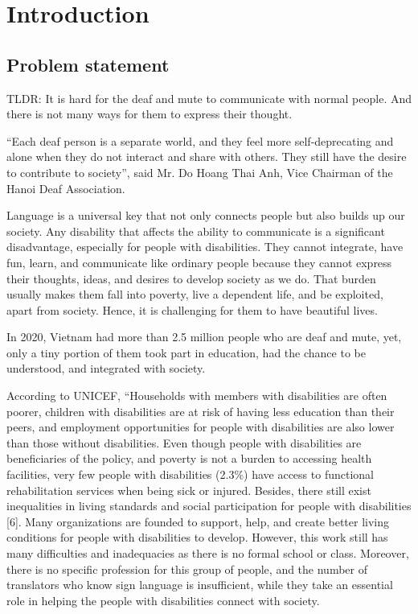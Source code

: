 \chapter {Introduction}
	
\section{Problem statement}


TLDR: It is hard for the deaf and mute to communicate with normal people. And there is not many ways for them to express their thought.

“Each deaf person is a separate world, and they feel more self-deprecating and alone when they do not interact and share with others. They still have the desire to contribute to society”, said Mr. Do Hoang Thai Anh, Vice Chairman of the Hanoi Deaf Association.

Language is a universal key that not only connects people but also builds up our society. Any disability that affects the ability to communicate is a significant disadvantage, especially for people with disabilities. They cannot integrate, have fun, learn, and communicate like ordinary people because they cannot express their thoughts, ideas, and desires to develop society as we do. That burden usually makes them fall into poverty, live a dependent life, and be exploited, apart from society. Hence, it is challenging for them to have beautiful lives.

In 2020, Vietnam had more than 2.5 million people who are deaf and mute, yet, only a tiny portion of them took part in education, had the chance to be understood, and integrated with society.

According to UNICEF, “Households with members with disabilities are often poorer, children with disabilities are at risk of having less education than their peers, and employment opportunities for people with disabilities are also lower than those without disabilities. Even though people with disabilities are beneficiaries of the policy, and poverty is not a burden to accessing health facilities, very few people with disabilities (2.3\%) have access to functional rehabilitation services when being sick or injured. Besides, there still exist inequalities in living standards and social participation for people with disabilities [6]. Many organizations are founded to support, help, and create better living conditions for people with disabilities to develop. However, this work still has many difficulties and inadequacies as there is no formal school or class. Moreover, there is no specific profession for this group of people, and the number of translators who know sign language is insufficient, while they take an essential role in helping the people with disabilities connect with society.

